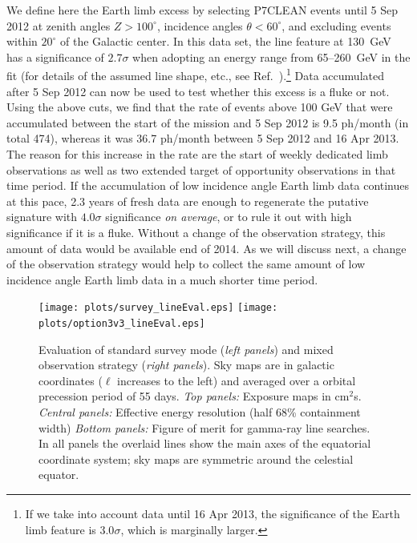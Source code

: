 \documentclass[aps,prd,superscriptaddress,showpacs,nofootinbib,fixlfloat, 12pt]{revtex4-1}
\begin{document}
We define here the Earth limb excess by selecting P7CLEAN events until 5 Sep 2012 at zenith angles $Z>100^\circ$,
incidence angles $\theta<60^\circ$, and excluding events within $20^\circ$ of
the Galactic center. In this data set, the line feature at 130~GeV has a
significance of $2.7\sigma$ when
adopting an energy range from 65--260~GeV in the fit (for details of the
assumed line shape, etc.,
see Ref.~\cite{finkbeiner_systematics}).\footnote{If we take into account data
  until 16 Apr 2013, the
significance of the Earth limb feature is $3.0\sigma$, which is marginally
larger.}
Data accumulated after 5 Sep 2012 can
now be used to test whether this excess is a fluke or not. Using the above
cuts, we find that the rate of events above 100 GeV that were accumulated between the
start of the mission and 5 Sep 2012 is 9.5 ph/month (in total 474), whereas it
was 36.7 ph/month between 5 Sep 2012 and 16 Apr 2013. The reason for this increase
in the rate are the start of weekly dedicated limb observations as well as two extended
target of opportunity observations in that time period. If the accumulation of
low incidence angle Earth limb data continues at this pace, 2.3 years of fresh
data are enough to regenerate the putative signature with $4.0\sigma$
significance \emph{on average}, or to rule it out with high significance if it is a
fluke. Without a change of the observation strategy, this amount of data would
be available end of 2014. As we will discuss next, a change of the
observation strategy would help to collect the same amount of low incidence
angle Earth limb data in a much shorter time period.



\begin{figure}[t]
  \begin{center}
    \texttt{[image: plots/survey\_lineEval.eps]}
    \texttt{[image: plots/option3v3\_lineEval.eps]}
    \vspace{-0.5cm}
  \end{center}
  \caption{Evaluation of standard survey mode (\emph{left panels}) and mixed observation
    strategy (\emph{right panels}). Sky maps are in galactic coordinates ($\ell$ increases
    to the left) and averaged over a orbital precession period of 55 days.
    \emph{Top
      panels:} Exposure maps in cm$^2$s.
    \emph{Central panels:}
    Effective energy resolution (half 68\% containment width)
  \emph{Bottom panels:} Figure of merit for gamma-ray line searches. In all
  panels the overlaid lines show the main axes of the equatorial coordinate
  system; sky maps are symmetric around the celestial equator.}
  \label{fig:mollweide}
\end{figure}
\end{document}
